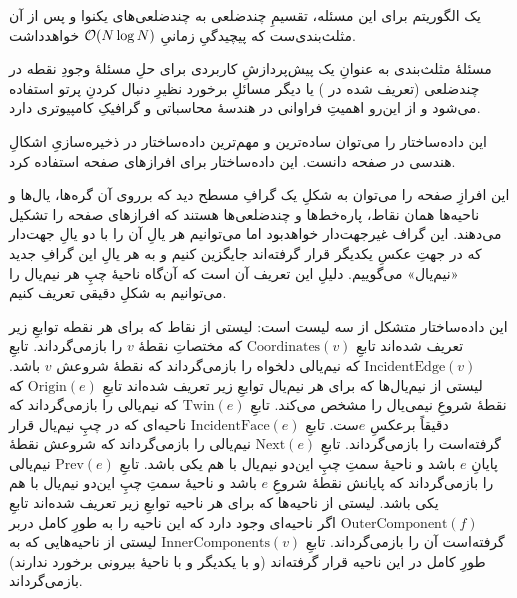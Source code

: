  یک الگوریتم برای این مسئله، تقسیمِ چندضلعی به چندضلعی‌های یکنوا و پس از آن مثلث‌بندی‌ست که پیچیدگیِ زمانیِ
$\mathcal{O}(N \log N)$
خواهدداشت.

مسئلهٔ مثلث‌بندی به عنوانِ یک پیش‌پردازشِ کاربردی برای حلِ مسئلهٔ 
وجودِ نقطه در چندضلعی (تعریف شده در ) یا دیگر مسائلِ برخورد نظیرِ دنبال کردنِ پرتو استفاده می‌شود و از این‌رو اهمیتِ فراوانی در هندسهٔ محاسباتی و گرافیکِ کامپیوتری دارد. 


این داده‌ساختار را می‌توان ساده‌ترین و مهم‌ترین داده‌ساختار در ذخیره‌سازیِ اشکالِ هندسی در صفحه دانست. این داده‌ساختار برای افرازهای صفحه استفاده کرد.

این افرازِ صفحه را می‌توان به شکلِ یک گرافِ مسطح دید که برروی آن گره‌ها، یال‌ها و ناحیه‌ها همان نقاط، پاره‌خط‌ها و چندضلعی‌ها هستند که افرازهای صفحه را تشکیل می‌دهند. این گراف غیرجهت‌دار خواهدبود اما می‌توانیم هر یالِ آن را با دو یالِ جهت‌دار که در جهتِ عکسِ یکدیگر قرار گرفته‌اند جایگزین کنیم و به هر یالِ این گرافِ جدید «نیم‌یال» می‌گوییم. دلیلِ این تعریف آن است که آن‌گاه ناحیهٔ چپِ هر نیم‌یال را می‌توانیم به شکلِ دقیقی تعریف کنیم.

این داده‌ساختار متشکل از سه لیست است:
     لیستی از نقاط که برای هر نقطه توابعِ زیر تعریف شده‌اند
         تابعِ $\mathrm{Coordinates}(v)$ که مختصاتِ نقطهٔ $v$ را بازمی‌گرداند.
         تابعِ $\mathrm{IncidentEdge}(v)$ که نیم‌یالی دلخواه را بازمی‌گرداند که نقطهٔ شروعش $v$ باشد. 
     لیستی از نیم‌یال‌ها که برای هر نیم‌یال توابعِ زیر تعریف شده‌اند
         تابعِ $\mathrm{Origin}(e)$ که نقطهٔ شروعِ نیمی‌یال را مشخص می‌کند.
         تابعِ $\mathrm{Twin}(e)$ که نیم‌یالی را بازمی‌گرداند که دقیقاً برعکسِ $e$ست.
         تابعِ $\mathrm{IncidentFace}(e)$ ناحیه‌ای که در چپِ نیم‌یال قرار گرفته‌است را بازمی‌گرداند.
         تابعِ $\mathrm{Next}(e)$ نیم‌یالی را بازمی‌گرداند که شروعش نقطهٔ پایانِ $e$ باشد و ناحیهٔ سمتِ چپِ این‌دو نیم‌یال با هم یکی باشد.
         تابعِ $\mathrm{Prev}(e)$ نیم‌یالی را بازمی‌گرداند که پایانش نقطهٔ شروعِ $e$ باشد و ناحیهٔ سمتِ چپِ این‌دو نیم‌یال با هم یکی باشد.
     لیستی از ناحیه‌ها که برای هر ناحیه توابعِ زیر تعریف شده‌اند
         تابعِ $\mathrm{OuterComponent}(f)$ اگر ناحیه‌ای وجود دارد که این ناحیه را به طورِ کامل دربر گرفته‌است آن را بازمی‌گرداند.
         تابعِ $\mathrm{InnerComponents}(v)$ لیستی از ناحیه‌هایی که به طورِ کامل در این ناحیه قرار گرفته‌اند (و با یکدیگر و با ناحیهٔ بیرونی برخورد ندارند) بازمی‌گرداند.

